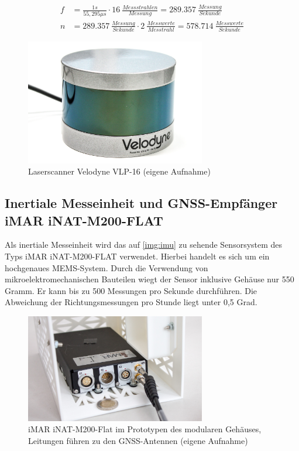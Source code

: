 \documentclass[a4paper,12pt,bibliography=totoc, listof=totoc,titlepage,pointlessnumbers]{scrreprt}
\begin{document}
\begin{equation}
 \label{equ:XproS}
 \begin{aligned}
  f &= \frac{1s}{55,295\mu s} \cdot 16~\frac{Messstrahlen}{Messung} = 289.357~\frac{Messung}{Sekunde} \\
  n &= 289.357~\frac{Messung}{Sekunde} \cdot 2~\frac{Messwerte}{Messtrahl} = 578.714~\frac{Messwerte}{Sekunde}
 \end{aligned}
\end{equation}

\begin{figure}
 \centering
 \includegraphics[width=0.7\textwidth]{./img/vlp16.jpg}
 \caption{Laserscanner Velodyne VLP-16 (eigene Aufnahme)}
 \label{img:vlp16}
\end{figure}

\subsection{Inertiale Messeinheit und GNSS-Empfänger iMAR iNAT-M200-FLAT}
\label{s:iMar}
Als inertiale Messeinheit wird das auf \autoref{img:imu} zu sehende Sensorsystem des Typs iMAR iNAT-M200-FLAT verwendet. Hierbei handelt es sich um ein hochgenaues MEMS-System. Durch die Verwendung von mikroelektromechanischen Bauteilen wiegt der Sensor inklusive Gehäuse nur 550 Gramm. Er kann bis zu 500 Messungen pro Sekunde durchführen. Die Abweichung der Richtungsmessungen pro Stunde liegt unter 0,5 Grad. \citep{imar}

\begin{figure}
 \centering
 \includegraphics[width=0.7\textwidth]{./img/imu.jpg}
 \caption{iMAR iNAT-M200-Flat im Prototypen des modularen Gehäuses, Leitungen führen zu den GNSS-Antennen (eigene Aufnahme)}
 \label{img:imu}
\end{figure}
\end{document}

